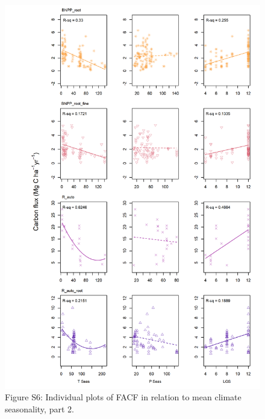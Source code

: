 \documentclass[]{article}
\begin{document}
\begin{figure}[H]
\includegraphics[width=1\linewidth]{tables_figures/grid_plots_seasonality4} \caption{Figure S6: Individual plots of FACF in relation to mean climate seasonality, part 2.}\label{fig:unnamed-chunk-12}
\end{figure}

\newpage
\end{document}

